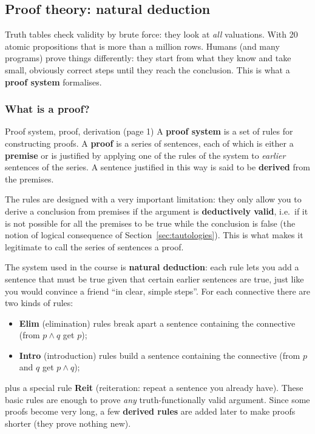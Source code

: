 \subsection{Proof theory: natural deduction}
\label{sec:natural-deduction-prop}

Truth tables check validity by brute force: they look at \emph{all} valuations. With 20
atomic propositions that is more than a million rows. Humans (and many programs) prove
things differently: they start from what they know and take small, obviously correct
steps until they reach the conclusion. This is what a \textbf{proof system} formalises.

\subsubsection{What is a proof?}

\begin{nbdef}{Proof system, proof, derivation (page 1)}
A \textbf{proof system} is a set of rules for constructing proofs. A \textbf{proof} is a
series of sentences, each of which is either a \textbf{premise} or is justified by applying
one of the rules of the system to \emph{earlier} sentences of the series. A sentence
justified in this way is said to be \textbf{derived} from the premises.
\end{nbdef}

The rules are designed with a very important limitation: they only allow you to derive a
conclusion from premises if the argument is \textbf{deductively valid}, i.e.\ if it is not
possible for all the premises to be true while the conclusion is false (the notion of
logical consequence of Section~\ref{sec:tautologies}). This is what makes it legitimate
to call the series of sentences a proof.

The system used in the course is \textbf{natural deduction}: each rule lets you add a
sentence that must be true given that certain earlier sentences are true, just like you
would convince a friend ``in clear, simple steps''. For each connective there are two kinds
of rules:
\begin{itemize}[nosep]
  \item \textbf{Elim} (elimination) rules break apart a sentence containing the connective
        (from $p \land q$ get $p$);
  \item \textbf{Intro} (introduction) rules build a sentence containing the connective
        (from $p$ and $q$ get $p \land q$);
\end{itemize}
plus a special rule \textbf{Reit} (reiteration: repeat a sentence you already have). These
basic rules are enough to prove \emph{any} truth-functionally valid argument. Since some
proofs become very long, a few \textbf{derived rules} are added later to make proofs shorter
(they prove nothing new).

